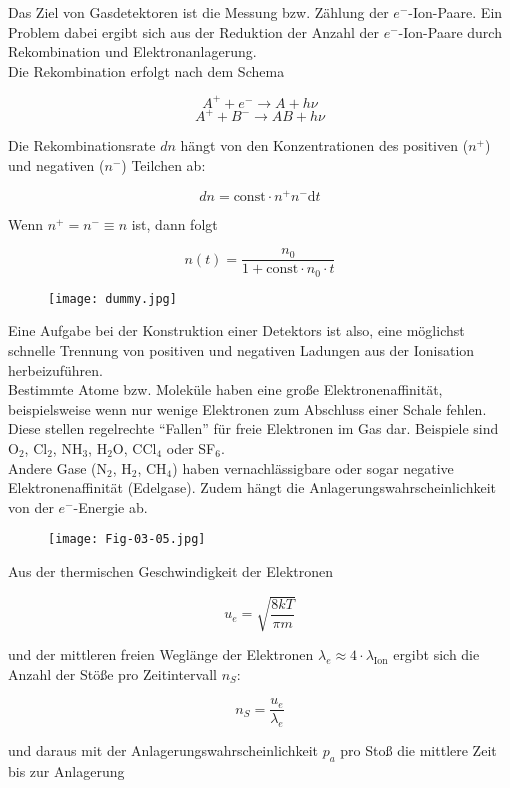 Das Ziel von Gasdetektoren ist die Messung bzw. Zählung der $e^-$-Ion-Paare. Ein Problem dabei
ergibt sich aus der Reduktion der Anzahl der $e^-$-Ion-Paare durch Rekombination und
Elektronanlagerung.
\\
Die Rekombination erfolgt nach dem Schema

\[A^+ + e^- \longrightarrow A + h\nu \]
\[A^+ + B^- \longrightarrow AB + h\nu  \]

Die Rekombinationsrate $dn$ hängt von den Konzentrationen des positiven ($n^+$) und negativen
($n^-$) Teilchen ab:

\[dn= \text{const}\cdot n^+ n^- \mathrm{d}t \]

Wenn $n^+=n^-\equiv n$ ist, dann folgt

\[n(t) = \frac{n_0}{1+\text{const}\cdot n_0\cdot t}  \]

\begin{figure}[H]
	\centering
	\texttt{[image: dummy.jpg]}
\end{figure}

Eine Aufgabe bei der Konstruktion einer Detektors ist also, eine möglichst schnelle Trennung von
positiven und negativen Ladungen aus der Ionisation herbeizuführen.
\\
Bestimmte Atome bzw. Moleküle haben eine große Elektronenaffinität, beispielsweise wenn nur wenige
Elektronen zum Abschluss einer Schale fehlen. Diese stellen regelrechte "`Fallen"' für
freie Elektronen im Gas dar. Beispiele sind O$_2$, Cl$_2$, NH$_3$, H$_2$O, CCl$_4$ oder SF$_6$.
\\
Andere Gase (N$_2$, H$_2$, CH$_4$) haben vernachlässigbare oder sogar negative
Elektronenaffinität (Edelgase). Zudem hängt die Anlagerungswahrscheinlichkeit von der $e^-$-Energie
ab.

\begin{figure}[H]
	\centering
	\texttt{[image: Fig-03-05.jpg]}
\end{figure}

Aus der thermischen Geschwindigkeit der Elektronen 

\[u_e = \sqrt{\frac{8kT}{\pi m}}  \]

und der mittleren freien Weglänge der Elektronen $\lambda_e \approx 4\cdot \lambda_{\text{Ion}}$
ergibt sich die Anzahl der Stöße pro Zeitintervall $n_S$:

\[ n_S = \frac{u_e}{\lambda_e}  \]

und daraus mit der Anlagerungswahrscheinlichkeit $p_a$ pro Stoß die mittlere Zeit bis zur Anlagerung

